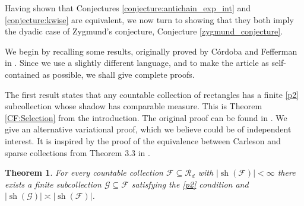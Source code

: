 \documentclass[oneside]{amsart}
\newtheorem{theorem}{Theorem}
\theoremstyle{definition}
\theoremstyle{plain}
\numberwithin{equation}{section}
\numberwithin{theorem}{section}
\newcommand{\sh}{\operatorname{sh}}
\begin{document}
Having shown that Conjectures \ref{conjecture:antichain_exp_int} and
\ref{conjecture:kwise} are equivalent, we now turn to showing that they both
imply the dyadic case of Zygmund's conjecture, Conjecture
\ref{zygmund_conjecture}.

We begin by recalling some results, originally proved by Córdoba and Fefferman
in \cite{CordobaFefferman1975}.
Since we use a slightly different language, and to make the article as
self-contained as possible, we shall give complete proofs.

The first result states that any countable collection of rectangles has a
finite \eqref{p2} subcollection whose shadow has comparable measure.
This is Theorem \ref{CF:Selection} from the introduction.
The original proof can be found in \cite{CordobaFefferman1975}.
We give an alternative variational proof, which we believe could be of
independent interest.
It is inspired by the proof of the equivalence between Carleson and sparse
collections from Theorem 3.3 in \cite{Barron2019}.
\begin{theorem}
  \label{zygmund:Selection}
  For every countable collection $\mathcal{F} \subseteq \mathcal{R}_d$ with
  $|\sh(\mathcal{F})| < \infty$ there
  exists a finite subcollection $\mathcal{G} \subseteq \mathcal{F}$ satisfying
  the \eqref{p2} condition and
  $|\sh(\mathcal{G})| \asymp |\sh(\mathcal{F})|$.
\end{theorem}
\end{document}
